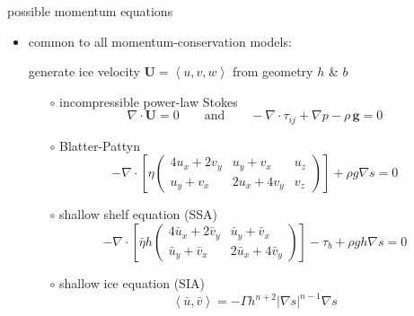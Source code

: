 \documentclass{beamer}
\newcommand\bU{\mathbf{U}}
\newcommand\Div{\nabla\cdot}
\newcommand\grad{\nabla}
\newcommand{\ip}[2]{\ensuremath{\left<#1,#2\right>}}
\begin{document}
\begin{frame}{possible momentum equations}

\begin{itemize}
\item common to all momentum-conservation models:
\begin{center}
\alert{generate ice velocity $\bU=\left<u,v,w\right>$ from geometry $h$ \& $b$}
\end{center}

  \begin{itemize}
  \footnotesize
  \item[$\circ$] incompressible power-law Stokes
\begin{equation*}
  \nabla \cdot \bU = 0 \qquad \text{and} \qquad - \nabla \cdot \tau_{ij} + \nabla p - \rho\, \mathbf{g} = 0
\end{equation*}
  \item[$\circ$] Blatter-Pattyn
$$-\Div \left[\eta \begin{pmatrix}
4 u_x+2v_y & u_y+v_x   & u_z \\
u_y+v_x    & 2u_x+4v_y & v_z
\end{pmatrix} \right] + \rho g \grad s = 0$$
  \item[$\circ$] shallow shelf equation (SSA)
$$-\Div \left[\bar \eta h \begin{pmatrix}
4 \bar u_x+2\bar v_y & \bar u_y+\bar v_x   \\
\bar u_y+\bar v_x    & 2\bar u_x+4\bar v_y
\end{pmatrix} \right] - \tau_b + \rho g h \grad s = 0$$
  \item[$\circ$] shallow ice equation (SIA)
$$\ip{\bar u}{\bar v} = -\Gamma h^{n+2} |\grad s|^{n-1} \grad s$$
  \end{itemize}
\end{itemize}
\end{frame}
\end{document}

